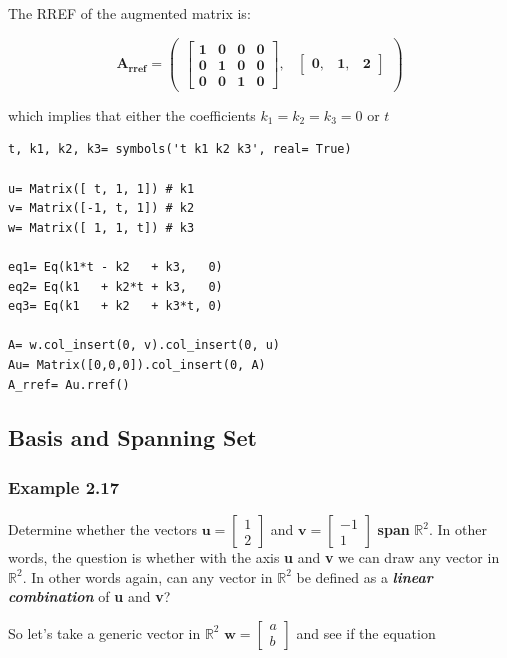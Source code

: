 The RREF of the augmented matrix is:

$$
\mathbf{A_{rref} = \begin{pmatrix}\left[\begin{matrix}1 & 0 & 0 & 0\\0 & 1 & 0 & 0\\0 & 0 & 1 & 0\end{matrix}\right], & \begin{bmatrix}0, & 1, & 2\end{bmatrix}\end{pmatrix}}
$$

which implies that either the coefficients $k_1 = k_2 = k_3 = 0$ or $t$

\begin{verbatim}
t, k1, k2, k3= symbols('t k1 k2 k3', real= True)

u= Matrix([ t, 1, 1]) # k1
v= Matrix([-1, t, 1]) # k2
w= Matrix([ 1, 1, t]) # k3

eq1= Eq(k1*t - k2   + k3,   0)
eq2= Eq(k1   + k2*t + k3,   0)
eq3= Eq(k1   + k2   + k3*t, 0)

A= w.col_insert(0, v).col_insert(0, u)
Au= Matrix([0,0,0]).col_insert(0, A)
A_rref= Au.rref()
\end{verbatim}

\subsection{Basis and Spanning Set}

\subsubsection{Example 2.17}

Determine whether the vectors $\mathbf{u} = \left[\begin{matrix}1\\2\end{matrix}\right]$
and $\mathbf{v} = \left[\begin{matrix}-1\\1\end{matrix}\right]$ \textbf{span} $\mathbb{R}^2$.
In other words, the question is whether with the axis \textbf{u} and \textbf{v}
we can draw any vector in $\mathbb{R}^2$. In other words again, can any vector in
$\mathbb{R}^2$ be defined as a \emph{\textbf{linear combination}} of \textbf{u} and \textbf{v}?

So let's take a generic vector in $\mathbb{R}^2$ $\mathbf{w} = \left[\begin{matrix}a\\b\end{matrix}\right]$
and see if the equation

